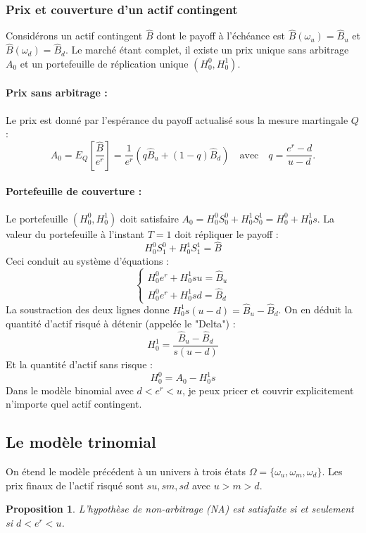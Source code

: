 \documentclass[12pt,a4paper]{article}
\numberwithin{equation}{section}
\theoremstyle{plain} %
\newtheorem{proposition}{Proposition}
\theoremstyle{definition} %
\theoremstyle{remark} %
\theoremstyle{myexample}
\theoremstyle{definition}
\begin{document}
\subsubsection{Prix et couverture d'un actif contingent}
Considérons un actif contingent $\hat{B}$ dont le payoff à l'échéance est $\hat{B}(\omega_u) = \hat{B}_u$ et $\hat{B}(\omega_d) = \hat{B}_d$.
Le marché étant complet, il existe un prix unique sans arbitrage $A_0$ et un portefeuille de réplication unique $(H_0^0, H_0^1)$.

\paragraph{Prix sans arbitrage :}
Le prix est donné par l'espérance du payoff actualisé sous la mesure martingale $Q$ :
\[
A_0 = E_Q\left[\frac{\hat{B}}{e^r}\right] = \frac{1}{e^r} \left( q \hat{B}_u + (1-q) \hat{B}_d \right) \quad \text{avec} \quad q = \frac{e^r - d}{u - d}.
\]

\paragraph{Portefeuille de couverture :}
Le portefeuille $(H_0^0, H_0^1)$ doit satisfaire $A_0 = H_0^0 S_0^0 + H_0^1 S_0^1 = H_0^0 + H_0^1 s$.
La valeur du portefeuille à l'instant $T=1$ doit répliquer le payoff :
\[
H_0^0 S_1^0 + H_0^1 S_1^1 = \hat{B}
\]
Ceci conduit au système d'équations :
\[
\begin{cases}
    H_0^0 e^r + H_0^1 su = \hat{B}_u \\
    H_0^0 e^r + H_0^1 sd = \hat{B}_d
\end{cases}
\]
La soustraction des deux lignes donne $H_0^1 s(u-d) = \hat{B}_u - \hat{B}_d$. On en déduit la quantité d'actif risqué à détenir (appelée le "Delta") :
\[
H_0^1 = \frac{\hat{B}_u - \hat{B}_d}{s(u-d)}
\]
Et la quantité d'actif sans risque :
\[
H_0^0 = A_0 - H_0^1 s
\]
Dans le modèle binomial avec $d < e^r < u$, je peux pricer et couvrir explicitement n'importe quel actif contingent.

\subsection{Le modèle trinomial}
On étend le modèle précédent à un univers à trois états $\Omega = \{\omega_u, \omega_m, \omega_d\}$. Les prix finaux de l'actif risqué sont $su, sm, sd$ avec $u > m > d$.

\begin{proposition}
L'hypothèse de non-arbitrage (NA) est satisfaite si et seulement si $d < e^r < u$.
\end{proposition}
\end{document}
